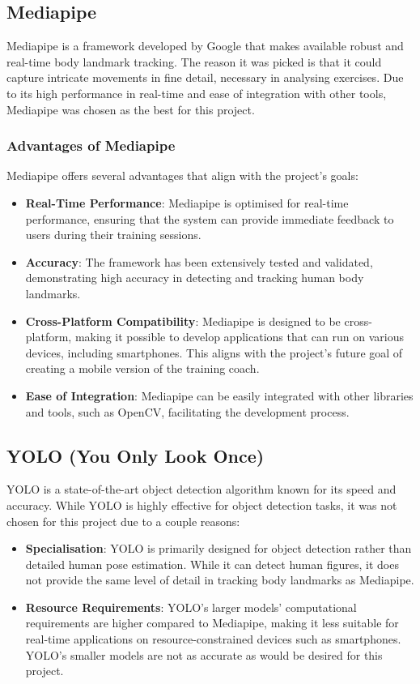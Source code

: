     \subsection{Mediapipe}   
        Mediapipe is a framework developed by Google that makes available robust and real-time body landmark tracking. The reason it was picked is that it could capture intricate movements in fine detail, necessary in analysing exercises. Due to its high performance in real-time and ease of integration with other tools, Mediapipe was chosen as the best for this project. 
        \subsubsection{Advantages of Mediapipe}
            Mediapipe offers several advantages that align with the project's goals:
            \begin{itemize}
                \item \textbf{Real-Time Performance}: Mediapipe is optimised for real-time performance, ensuring that the system can provide immediate feedback to users during their training sessions.
                \item \textbf{Accuracy}: The framework has been extensively tested and validated, demonstrating high accuracy in detecting and tracking human body landmarks.
                \item \textbf{Cross-Platform Compatibility}: Mediapipe is designed to be cross-platform, making it possible to develop applications that can run on various devices, including smartphones. This aligns with the project's future goal of creating a mobile version of the training coach.
                \item \textbf{Ease of Integration}: Mediapipe can be easily integrated with other libraries and tools, such as OpenCV, facilitating the development process.
            \end{itemize}
    \subsection{YOLO (You Only Look Once)}
        YOLO is a state-of-the-art object detection algorithm known for its speed and accuracy. While YOLO is highly effective for object detection tasks, it was not chosen for this project due to a couple reasons:
        \begin{itemize}
            \item \textbf{Specialisation}: YOLO is primarily designed for object detection rather than detailed human pose estimation. While it can detect human figures, it does not provide the same level of detail in tracking body landmarks as Mediapipe.
            \item \textbf{Resource Requirements}: YOLO's larger models' computational requirements are higher compared to Mediapipe, making it less suitable for real-time applications on resource-constrained devices such as smartphones. YOLO's smaller models are not as accurate as would be desired for this project.
        \end{itemize}
